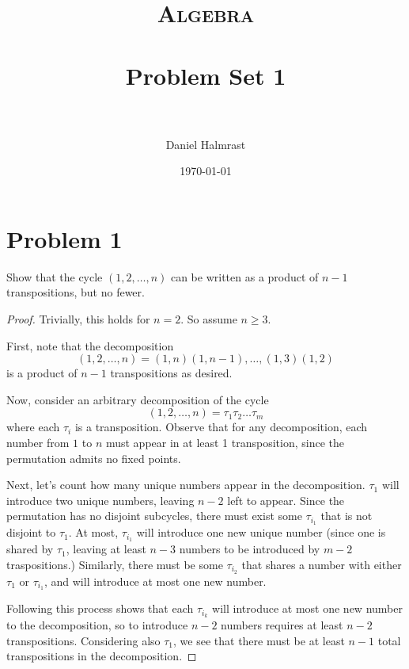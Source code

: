 \documentclass[paper=a4, fontsize=11pt]{scrartcl} %
\title{	
\normalfont \normalsize 
\textsc{Algebra} \\ [25pt] %
\horrule{0.5pt} \\[0.4cm] %
\huge Problem Set 1\\ %
\horrule{2pt} \\[0.5cm] %
}
\author{Daniel Halmrast} %
\date{\normalsize\today} %
\numberwithin{equation}{section} %
\numberwithin{figure}{section} %
\numberwithin{table}{section} %
\begin{document}
\maketitle %

\section*{Problem 1}
Show that the cycle $(1,2,\ldots,n)$ can be written as a product of $n-1$ transpositions, but no
fewer.
\\
\begin{proof}
Trivially, this holds for $n=2$. So assume $n\geq 3$.

First, note that the decomposition
\[
(1,2,\ldots,n) = (1,n)(1,n-1),\ldots,(1,3)(1,2)
\]
is a product of $n-1$ transpositions as desired.

Now, consider an arbitrary decomposition of the cycle
\[
(1,2,\ldots,n) = \tau_1 \tau_2 \ldots \tau_m
\]
where each $\tau_i$ is a transposition. Observe that for any decomposition, each number
from $1$ to $n$ must appear in at least 1 transposition, since the permutation admits no
fixed points.

Next, let's count how many unique numbers appear in the decomposition.
$\tau_1$ will introduce two unique numbers, leaving $n-2$ left to appear. Since
the permutation has no disjoint subcycles, there must exist some $\tau_{i_1}$ that
is not disjoint to $\tau_1$. 
At most, $\tau_{i_1}$ will introduce one new unique number (since one is shared by $\tau_1$,
leaving at least $n-3$ numbers to be introduced by $m-2$ traspositions.) 
Similarly, there must be some $\tau_{i_2}$ that shares a number with either $\tau_1$ or
$\tau_{i_1}$, and will introduce at most one new number.

Following this process shows that each $\tau_{i_k}$ will introduce at most one new number
to the decomposition, so to introduce $n-2$ numbers requires at least $n-2$ transpositions.
Considering also $\tau_1$, we see that there must be at least $n-1$ total transpositions in
the decomposition.

\end{proof}


\end{document}
